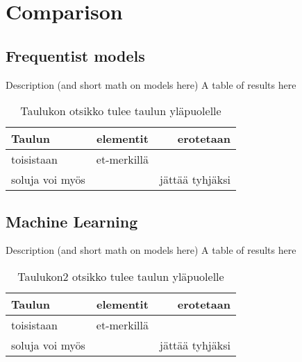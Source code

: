 \chapter{Comparison} \label{Comparison}

\section{Frequentist models}\label{FrequentistModels}
Description (and short math on models here)
A table of results here

\begin{table}
\centering{}\caption{Taulukon otsikko tulee taulun yläpuolelle\label{tab:Taulukon-otsikko-tulee}}
\begin{tabular}{l|c|r|}
Taulun  & elementit  & erotetaan \tabularnewline
\hline 
toisistaan  & et-merkillä  & \tabularnewline
soluja voi myös  &  & jättää tyhjäksi \tabularnewline
\end{tabular}
\end{table}

\section{Machine Learning}\label{MachineLearning}
Description (and short math on models here)
A table of results here

\begin{table}
\centering{}\caption{Taulukon2 otsikko tulee taulun yläpuolelle\label{tab:Taulukon2-otsikko-tulee}}
\begin{tabular}{l|c|r|}
Taulun  & elementit  & erotetaan \tabularnewline
\hline 
toisistaan  & et-merkillä  & \tabularnewline
soluja voi myös  &  & jättää tyhjäksi \tabularnewline
\end{tabular}
\end{table}
